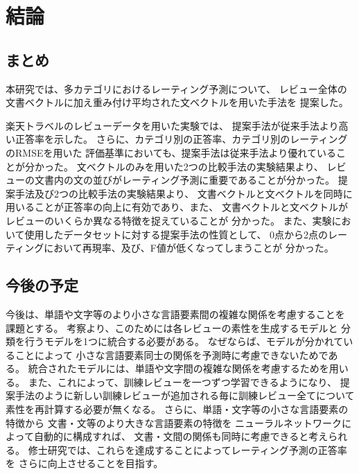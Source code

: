 \section{結論} \label{sec:Conclusion}

\subsection{まとめ}

本研究では、多カテゴリにおけるレーティング予測について、
レビュー全体の文書ベクトルに加え重み付け平均された文ベクトルを用いた手法を
提案した。

楽天トラベルのレビューデータを用いた実験では、
提案手法が従来手法\cite{fujitani15}より高い正答率を示した。
さらに、カテゴリ別の正答率、カテゴリ別のレーティングのRMSEを用いた
評価基準においても、提案手法は従来手法より優れていることが分かった。
文ベクトルのみを用いた2つの比較手法の実験結果より、
レビューの文書内の文の並びがレーティング予測に重要であることが分かった。
提案手法及び2つの比較手法の実験結果より、
文書ベクトルと文ベクトルを同時に用いることが正答率の向上に有効であり、また、
文書ベクトルと文ベクトルがレビューのいくらか異なる特徴を捉えていることが
分かった。
また、実験において使用したデータセットに対する提案手法の性質として、
0点から2点のレーティングにおいて再現率、及び、F値が低くなってしまうことが
分かった。


\subsection{今後の予定}

今後は、単語や文字等のより小さな言語要素間の複雑な関係を考慮することを
課題とする。
考察より、このためには各レビューの素性を生成するモデルと
分類を行うモデルを1つに統合する必要がある。
なぜならば、モデルが分かれていることによって
小さな言語要素同士の関係を予測時に考慮できないためである。
統合されたモデルには、単語や文字間の複雑な関係を考慮するため\nn を用いる。
また、これによって、訓練レビューを一つずつ学習できるようになり、
提案手法のように新しい訓練レビューが追加される毎に訓練レビュー全てについて
素性を再計算する必要が無くなる。
さらに、単語・文字等の小さな言語要素の特徴から
文書・文等のより大きな言語要素の特徴を
ニューラルネットワークによって自動的に構成すれば、
文書・文間の関係も同時に考慮できると考えられる。
修士研究では、これらを達成することによってレーティング予測の正答率を
さらに向上させることを目指す。
